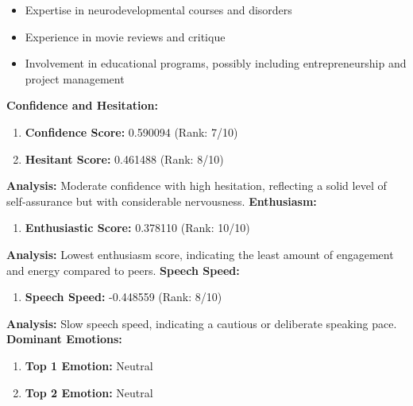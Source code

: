\documentclass{article}
\begin{document}
\begin{itemize}
    \item Expertise in neurodevelopmental courses and disorders
    \item Experience in movie reviews and critique
    \item Involvement in educational programs, possibly including entrepreneurship and project management
\end{itemize}
\vspace{0.1in}
\large{\textbf{Confidence and Hesitation:}}
\begin{tcolorbox}[ colback=purple!5!white,colframe=purple!75!black,  title=Confidence and Hesitant Scores]
    \begin{enumerate}
        \item \textbf{Confidence Score:} \textcolor{green!50!black}{0.590094} (Rank: 7/10)
        \item \textbf{Hesitant Score:} \textcolor{red!70!black}{0.461488} (Rank: 8/10)
    \end{enumerate}
\end{tcolorbox}
    \textbf{Analysis:} Moderate confidence with high hesitation, reflecting a solid level of self-assurance but with considerable nervousness.
    \vspace{0.1in}
\large{\textbf{Enthusiasm:}}
\begin{tcolorbox}[title=Enthusiastic Score]
    \begin{enumerate}
        \item \textbf{Enthusiastic Score:} \textcolor{orange!70!black}{0.378110} (Rank: 10/10)
    \end{enumerate}
\end{tcolorbox}
    \textbf{Analysis:} Lowest enthusiasm score, indicating the least amount of engagement and energy compared to peers.
    \vspace{0.1in}
\large{\textbf{Speech Speed:}}
\begin{tcolorbox}[ colback=purple!5!white,colframe=purple!75!black,  title=Speech Speed]
    \begin{enumerate}
        \item \textbf{Speech Speed:} \textcolor{purple!70!black}{-0.448559} (Rank: 8/10)
    \end{enumerate}
\end{tcolorbox}
    \textbf{Analysis:} Slow speech speed, indicating a cautious or deliberate speaking pace.
    \vspace{0.1in}
\large{\textbf{Dominant Emotions:}}
\begin{tcolorbox}[colback=red!5!white,colframe=red!75!black,title=Emotional State]
    \begin{enumerate}
        \item \textbf{Top 1 Emotion:} \textcolor{blue!80!black}{Neutral}
        \item \textbf{Top 2 Emotion:} \textcolor{red!80!black}{Neutral}
    \end{enumerate}
\end{tcolorbox}
\end{document}
